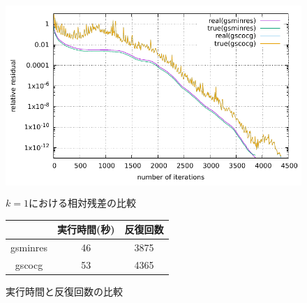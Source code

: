 

\begin{figure}[H]
	\begin{center}
		\begin{minipage}[]{0.49\columnwidth}
			\centering
			\colorbox{white}{ \includegraphics[scale=1.5]{./fig/compare-residual.pdf} }
			\caption{$k=1$における相対残差の比較}
			\label{fig-compare-residual}
		\end{minipage}
		\begin{minipage}[]{0.49\columnwidth}
			\centering
			\makeatletter
			\def\@captype{table}
			\makeatother
			\caption{実行時間と反復回数の比較}
			\label{table-compare-time-itrs}
			\begin{tabular}{ccc}
				\hline
						& 実行時間(秒)	& 反復回数	\\ \hline
				gsminres	& 46			& 3875	\\
				gscocg	& 53			& 4365	\\
				\hline
			\end{tabular}
		\end{minipage}
	\end{center}
\end{figure}

